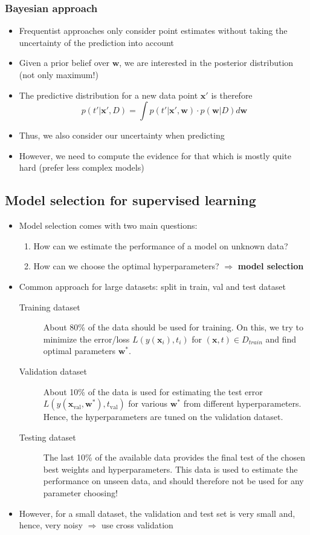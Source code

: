 \subsubsection{Bayesian approach}
\begin{itemize}
	\item Frequentist approaches only consider point estimates without taking the uncertainty of the prediction into account
	\item Given a prior belief over $\bm{w}$, we are interested in the posterior distribution (not only maximum!)
	\item The predictive distribution for a new data point $\bm{x}'$ is therefore 
	$$p(t'|\bm{x}',D) = \int p(t'| \bm{x}', \bm{w}) \cdot p(\bm{w}|D) d\bm{w}$$
	\item Thus, we also consider our uncertainty when predicting
	\item However, we need to compute the evidence for that which is mostly quite hard (prefer less complex models)
\end{itemize}
\subsection{Model selection for supervised learning}
\begin{itemize}
	\item Model selection comes with two main questions:
	\begin{enumerate}
		\item How can we estimate the performance of a model on unknown data?
		\item How can we choose the optimal hyperparameters? $\Rightarrow$ \textbf{model selection}
	\end{enumerate}
	\item Common approach for large datasets: split in train, val and test dataset
	\begin{description}
		\item[Training dataset] About 80\% of the data should be used for training. On this, we try to minimize the error/loss $L\left(y(\bm{x}_i),t_i\right)$ for $(\bm{x},t)\in D_{train}$ and find optimal parameters $\bm{w}^*$.
		\item[Validation dataset] About 10\% of the data is used for estimating the test error $L\left(y(\bm{x}_{\text{val}}, \bm{w}^*),t_{\text{val}}\right)$ for various $\bm{w}^*$ from different hyperparameters. Hence, the hyperparameters are tuned on the validation dataset.
		\item[Testing dataset] The last 10\% of the available data provides the final test of the chosen best weights and hyperparameters. This data is used to estimate the performance on unseen data, and should therefore not be used for any parameter choosing!
	\end{description}
	\item However, for a small dataset, the validation and test set is very small and, hence, very noisy $\Rightarrow$ use cross validation
\end{itemize}

